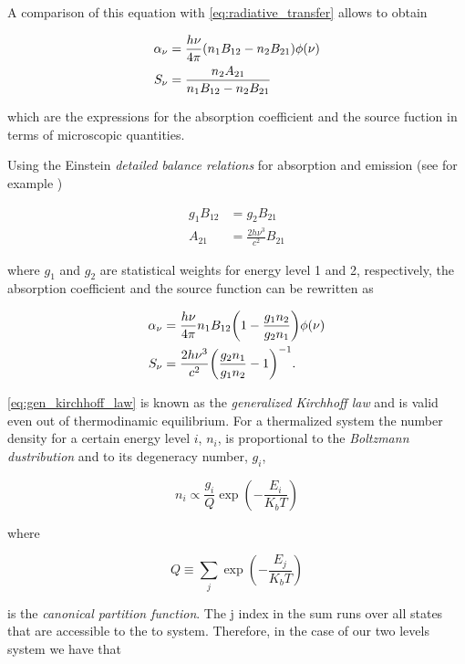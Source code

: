 A comparison of this equation with \autoref{eq:radiative_transfer} allows
to obtain

\begin{align}
        \alpha_\nu & = \frac{h\nu}{4\pi}\qty(n_1 B_{12} -
        n_2 B_{21})\phi\qty(\nu) \\
        S_\nu & = \frac{n_2 A_{21}}{n_1 B_{12} - n_2 B_{21}}
\end{align}

which are the expressions for the absorption coefficient and the source
fuction in terms of microscopic quantities.

Using the Einstein \emph{detailed balance relations} for absorption and
emission (see for example \cite{rybicki2008radiative})

\begin{align}
        g_1 B_{12} & = g_2 B_{21} \\
        A_{21} & = \frac{2h\nu^3}{c^2} B_{21}
\end{align}

where $g_1$ and $g_2$ are statistical weights for energy level 1 and 2,
respectively, the absorption coefficient and the source function can be
rewritten as

\begin{align}
        \alpha_\nu & = \frac{h\nu}{4\pi} n_1 B_{12}
        \qty(1 - \frac{g_1 n_2}{g_2 n_1})\phi\qty(\nu)\\
        S_\nu & = \frac{2h\nu^3}{c^2}\qty(\frac{g_2 n_1}{g_1 n_2} - 1)^{-1}.
        \label{eq:gen_kirchhoff_law}
\end{align}

\autoref{eq:gen_kirchhoff_law} is known as the \emph{generalized Kirchhoff
law} and is valid even out of thermodinamic equilibrium. For a thermalized
system the number density for a certain energy level $i$, $n_i$, is
proportional to the \emph{Boltzmann dustribution} and to its degeneracy
number, $g_i$,

\begin{equation}
        n_i \propto \frac{g_i}{Q} \exp(-\frac{E_i}{K_b T})
\end{equation}

where

\begin{equation}
        Q \equiv \sum_j \exp(-\frac{E_j}{K_b T})
\end{equation}

is the \emph{canonical partition function}. The j index in the sum runs
over all states that are accessible to the to system. Therefore, in the
case of our two levels system we have that


